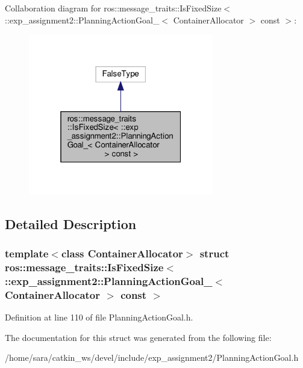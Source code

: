 Collaboration diagram for ros\+:\+:message\+\_\+traits\+:\+:Is\+Fixed\+Size$<$ \+:\+:exp\+\_\+assignment2\+:\+:Planning\+Action\+Goal\+\_\+$<$ Container\+Allocator $>$ const $>$\+:
\nopagebreak
\begin{figure}[H]
\begin{center}
\leavevmode
\includegraphics[width=229pt]{structros_1_1message__traits_1_1IsFixedSize_3_01_1_1exp__assignment2_1_1PlanningActionGoal___3_08f6b69c4510eb0b80c003682373ca7f1}
\end{center}
\end{figure}


\subsection{Detailed Description}
\subsubsection*{template$<$class Container\+Allocator$>$\newline
struct ros\+::message\+\_\+traits\+::\+Is\+Fixed\+Size$<$ \+::exp\+\_\+assignment2\+::\+Planning\+Action\+Goal\+\_\+$<$ Container\+Allocator $>$ const $>$}



Definition at line 110 of file Planning\+Action\+Goal.\+h.



The documentation for this struct was generated from the following file\+:\begin{DoxyCompactItemize}
\item 
/home/sara/catkin\+\_\+ws/devel/include/exp\+\_\+assignment2/Planning\+Action\+Goal.\+h\end{DoxyCompactItemize}

